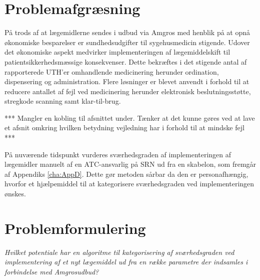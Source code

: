 \section{Problemafgræsning}
På trods af at lægemidlerne sendes i udbud via Amgros med henblik på at opnå økonomiske besparelser er sundhedsudgifter til sygehusmedicin stigende. Udover det økonomiske aspekt medvirker implementeringen af lægemiddelskift til patientsikkerhedsmæssige konsekvenser. Dette bekræftes i det stigende antal af rapporterede UTH'er omhandlende medicinering herunder ordination, dispensering og administration. Flere løsninger er blevet anvendt i forhold til at reducere antallet af fejl ved medicinering herunder elektronisk beslutningsstøtte, stregkode scanning samt klar-til-brug.

*** Mangler en kobling til afsnittet under. Tænker at det kunne gøres ved at lave et afsnit omkring hvilken betydning vejledning har i forhold til at mindske fejl ***

På nuværende tidspunkt vurderes sværhedsgraden af implementeringen af lægemidler manuelt af en ATC-ansvarlig på SRN ud fra en skabelon, som fremgår af Appendiks \ref{cha:AppD}. Dette gør metoden sårbar da den er personafhængig, hvorfor et hjælpemiddel til at kategorisere sværhedsgraden ved implementeringen ønskes. 

\section{Problemformulering}
\textit{Hvilket potentiale har en algoritme til kategorisering af sværhedsgraden ved implementering af et nyt lægemiddel ud fra en række parametre der indsamles i forbindelse med Amgrosudbud?}
